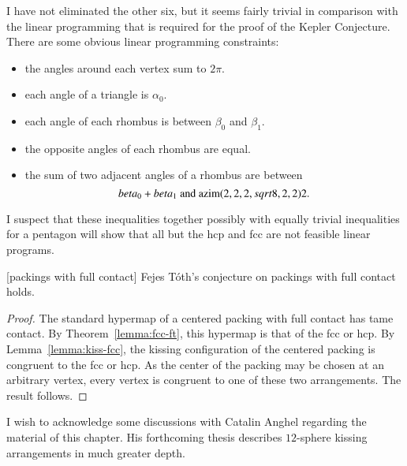 \begin{note}%
I have not eliminated the other six, but it seems fairly trivial in comparison with the linear programming that is required for the proof of the Kepler Conjecture.  There are some obvious linear programming constraints:
\begin{itemize}
\item the angles around each vertex sum to $2\pi$.
\item each angle of a triangle is $\alpha_0$.
\item each angle of each rhombus is between $\beta_0$ and $\beta_1$.
\item the opposite angles of each rhombus are equal.
\item the sum of two adjacent angles of a rhombus are between
$$
beta_0 + beta_1 \hbox{ and } {\operatorname{azim}}(2,2,2,sqrt8,2,2)2.
$$
\end{itemize}
I suspect that these inequalities together possibly with equally trivial inequalities for a pentagon will show that all but the hcp and fcc are not feasible linear programs.
\end{note}

\begin{theorem}[packings with full contact]  
Fejes T\'oth's conjecture on packings with full contact holds.
\end{theorem}

\begin{proof} The standard hypermap of a centered packing with full contact has tame contact.  By Theorem~\ref{lemma:fcc-ft}, this hypermap is that of the fcc or hcp.  By Lemma~\ref{lemma:kiss-fcc}, the kissing configuration of the centered packing is congruent to the fcc or hcp.  As the center of the packing may be chosen at an arbitrary vertex, every vertex is congruent to one of these two arrangements.  The result follows.
\end{proof}

\begin{note}%
I wish to acknowledge some discussions with Catalin Anghel regarding the material of this chapter.  His forthcoming thesis describes $12$-sphere kissing arrangements in much greater depth.
\end{note}